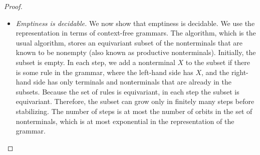 \begin{proof}
\begin{itemize}
	  	\item \emph{Emptiness is decidable.} We now show that emptiness is decidable. We use the representation in terms of  context-free grammars. The  algorithm, which is the usual algorithm, stores an equivariant subset of the nonterminals that are known to be nonempty (also known as productive nonterminals). Initially, the subset is empty. In each step, we add a nonterminal $X$ to the subset if there is some rule in the grammar, where the left-hand side has $X$, and the right-hand side has only terminals and nonterminals that are already in the subsets. Because the set of rules is equivariant, in each step the subset is equivariant. Therefore, the subset can grow only in finitely many steps before stabilizing. The number of steps is at most the number of orbits in the set of nonterminals, which is at most exponential in the representation of the grammar.
	\end{itemize}
\end{proof}
	

	



	\exercisepart

